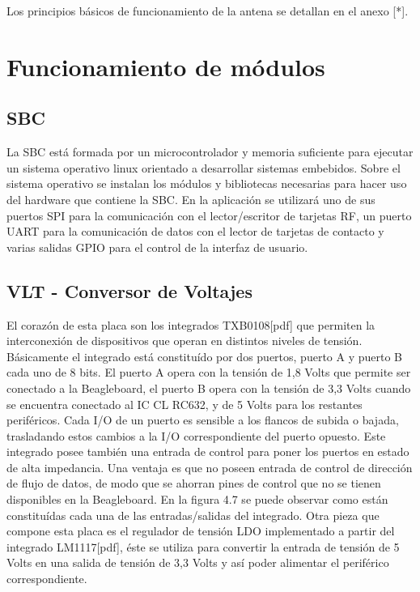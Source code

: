 Los principios básicos de funcionamiento de la antena se detallan en el anexo [*].

\section{Funcionamiento de m\'odulos}

\subsection{SBC}
La SBC está formada por un microcontrolador y memoria suficiente para ejecutar un sistema operativo linux orientado a desarrollar sistemas embebidos. Sobre el sistema operativo se instalan los módulos y bibliotecas necesarias para hacer uso del hardware que contiene la SBC. En la aplicación se utilizará uno de sus puertos SPI para la comunicación con el lector/escritor de tarjetas RF, un puerto UART para la comunicación de datos con el lector de tarjetas de contacto y varias salidas GPIO para el control de la interfaz de usuario.

\subsection{VLT - Conversor de Voltajes}
El corazón de esta placa son los integrados TXB0108[pdf] que permiten la interconexión de dispositivos que operan en distintos niveles de tensión. Básicamente el integrado está constituído por dos puertos, puerto A y puerto B cada uno de 8 bits. El puerto A opera con la tensión de 1,8 Volts que permite ser conectado a la Beagleboard, el puerto B opera con la tensión de 3,3 Volts cuando se encuentra conectado al IC CL RC632, y de 5 Volts para los restantes periféricos.
Cada I/O de un puerto es sensible a los flancos de subida o bajada, trasladando estos cambios a la I/O correspondiente del puerto opuesto. 
Este integrado posee también una entrada de control para poner los puertos en estado de alta impedancia.
Una ventaja es que no poseen entrada de control de dirección de flujo de datos, de modo que se ahorran pines de control que no se tienen disponibles en la Beagleboard.
En la figura 4.7 se puede observar como están constituídas cada una de las entradas/salidas del integrado.
Otra pieza que compone esta placa es el regulador de tensión LDO implementado a partir del integrado LM1117[pdf], éste se utiliza para convertir la entrada de tensión de 5 Volts en una salida de tensión de 3,3 Volts y así poder alimentar el periférico correspondiente.

